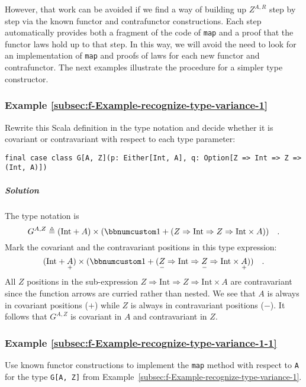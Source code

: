 However, that work can be avoided if we find a way of building up
$Z^{A,R}$ step by step via the known functor and contrafunctor constructions.
Each step automatically provides both a fragment of the code of \lstinline!map!
and a proof that the functor laws hold up to that step. In this way,
we will avoid the need to look for an implementation of \lstinline!map!
and proofs of laws for each new functor and contrafunctor. The next
examples illustrate the procedure for a simpler type constructor.

\subsubsection{Example \label{subsec:f-Example-recognize-type-variance-1}\ref{subsec:f-Example-recognize-type-variance-1}}

Rewrite this Scala definition in the type notation and decide whether
it is covariant or contravariant with respect to each type parameter:

\begin{lstlisting}
final case class G[A, Z](p: Either[Int, A], q: Option[Z => Int => Z => (Int, A)])
\end{lstlisting}


\subparagraph{Solution}

The type notation is
\[
G^{A,Z}\triangleq(\text{Int}+A)\times(\bbnum 1+(Z\Rightarrow\text{Int}\Rightarrow Z\Rightarrow\text{Int}\times A))\quad.
\]
Mark the covariant and the contravariant positions in this type expression:
\[
(\text{Int}+\underset{+}{A})\times(\bbnum 1+(\underset{-}{Z}\Rightarrow\text{Int}\Rightarrow\underset{-}{Z}\Rightarrow\text{Int}\times\underset{+}{A}))\quad.
\]
All $Z$ positions in the sub-expression $Z\Rightarrow\text{Int}\Rightarrow Z\Rightarrow\text{Int}\times A$
are contravariant since the function arrows are curried rather than
nested. We see that $A$ is always in covariant positions ($+$) while
$Z$ is always in contravariant positions ($-$). It follows that
$G^{A,Z}$ is covariant in $A$ and contravariant in $Z$. 

\subsubsection{Example \label{subsec:f-Example-recognize-type-variance-1-1}\ref{subsec:f-Example-recognize-type-variance-1-1}}

Use known functor constructions to implement the \lstinline!map!
method with respect to \lstinline!A! for the type \lstinline!G[A, Z]!
from Example~\ref{subsec:f-Example-recognize-type-variance-1}.

